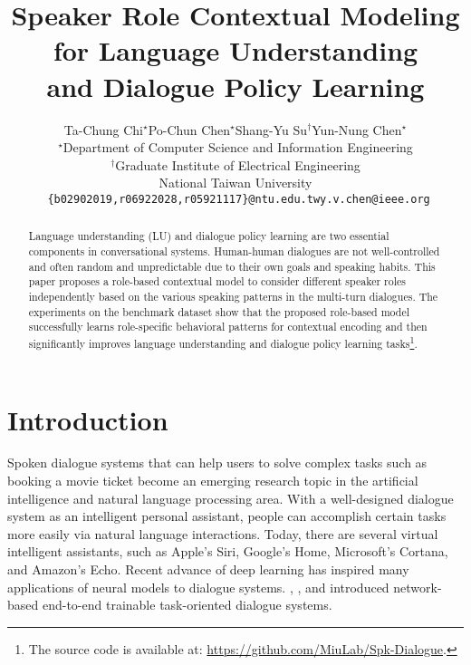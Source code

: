 \documentclass[11pt,letterpaper]{article}
\title{Speaker Role Contextual Modeling for Language Understanding\\ and Dialogue Policy Learning}
\author{Ta-Chung Chi$^\star$\quad Po-Chun Chen$^\star$\quad Shang-Yu Su$^\dagger$\quad Yun-Nung Chen$^\star$\\
$^\star$Department of Computer Science and Information Engineering\\
$^\dagger$Graduate Institute of Electrical Engineering\\
National Taiwan University\\
\texttt{ \{b02902019,r06922028,r05921117\}@ntu.edu.tw\quad y.v.chen@ieee.org}
}
\date{}
\begin{document}
\maketitle

\begin{abstract}
Language understanding (LU) and dialogue policy learning are two essential components in conversational systems.
Human-human dialogues are not well-controlled and often random and unpredictable due to their own goals and speaking habits.
This paper proposes a role-based contextual model to consider different speaker roles independently based on the various speaking patterns in the multi-turn dialogues.
The experiments on the benchmark dataset show that the proposed role-based model successfully learns role-specific behavioral patterns for contextual encoding and then significantly improves language understanding and dialogue policy learning tasks\footnote{The source code is available at: \url{https://github.com/MiuLab/Spk-Dialogue}.}.
\end{abstract}

\section{Introduction}
\label{sec:intro}
Spoken dialogue systems that can help users to solve complex tasks such as booking a movie ticket become an emerging research topic in the artificial intelligence and natural language processing area. 
With a well-designed dialogue system as an intelligent personal assistant, people can accomplish certain tasks more easily via natural language interactions. 
Today, there are several virtual intelligent assistants, such as Apple's Siri, Google's Home, Microsoft's Cortana, and Amazon's Echo. Recent advance of deep learning has inspired many applications of neural models to dialogue systems. , , and  introduced network-based end-to-end trainable task-oriented dialogue systems.
\end{document}
